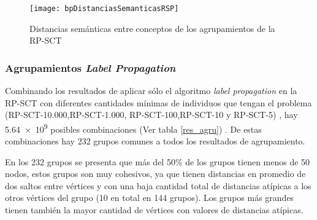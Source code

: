 \begin{figure}[ht]
\caption{Distancias semánticas entre conceptos de los agrupamientos de la \acrshort{RP-SCT}}
\label{fig:bpDistanciasSemanticasRSP}
\centering
\texttt{[image: bpDistanciasSemanticasRSP]}
\end{figure}

\subsubsection{Agrupamientos \textit{Label Propagation}}
Combinando los resultados de aplicar sólo el algoritmo \textit{label propagation} en la \acrshort{RP-SCT} con diferentes cantidades mínimas de individuos que tengan el problema (RP-SCT-10.000,RP-SCT-1.000, RP-SCT-100,RP-SCT-10 y RP-SCT-5) , hay \num{5.64e9} posibles combinaciones (Ver tabla \ref{res_agru}) .  De estas combinaciones hay 232 grupos comunes a todos los resultados de agrupamiento. 

En los 232 grupos se presenta que más del 50\% de los grupos tienen menos de 50 nodos, estos grupos son muy cohesivos, ya que tienen distancias en promedio de dos saltos entre vértices y con una baja cantidad total de distancias atípicas a los otros vértices del grupo (10 en total en 144 grupos). Los grupos más grandes tienen también la mayor cantidad de vértices con valores de distancias atípicas.

